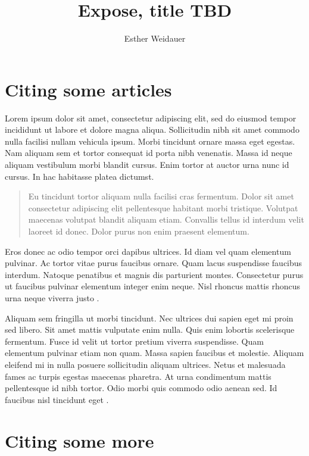 \documentclass[a4paper]{article}
\title{Expose, title TBD}
\author{Esther Weidauer}
\date{\DTMdate{2025-06-30}}
\begin{document}
\maketitle

\section{Citing some articles}

Lorem ipsum dolor sit amet, consectetur adipiscing elit, sed do eiusmod tempor incididunt ut labore et dolore magna aliqua. Sollicitudin nibh sit amet commodo nulla facilisi nullam vehicula ipsum. Morbi tincidunt ornare massa eget egestas. Nam aliquam sem et tortor consequat id porta nibh venenatis. Massa id neque aliquam vestibulum morbi blandit cursus. Enim tortor at auctor urna nunc id cursus. In hac habitasse platea dictumst.

\begin{quote}
	Eu tincidunt tortor aliquam nulla facilisi cras fermentum. Dolor sit amet consectetur adipiscing elit pellentesque habitant morbi tristique. Volutpat maecenas volutpat blandit aliquam etiam. Convallis tellus id interdum velit laoreet id donec. Dolor purus non enim praesent elementum.
\end{quote}

Eros donec ac odio tempor orci dapibus ultrices. Id diam vel quam elementum pulvinar. Ac tortor vitae purus faucibus ornare. Quam lacus suspendisse faucibus interdum. Natoque penatibus et magnis dis parturient montes. Consectetur purus ut faucibus pulvinar elementum integer enim neque. Nisl rhoncus mattis rhoncus urna neque viverra justo \autocite{chen_statistical_2017}.

\bigskip

Aliquam sem fringilla ut morbi tincidunt. Nec ultrices dui sapien eget mi proin sed libero. Sit amet mattis vulputate enim nulla. Quis enim lobortis scelerisque fermentum. Fusce id velit ut tortor pretium viverra suspendisse. Quam elementum pulvinar etiam non quam. Massa sapien faucibus et molestie. Aliquam eleifend mi in nulla posuere sollicitudin aliquam ultrices. Netus et malesuada fames ac turpis egestas maecenas pharetra. At urna condimentum mattis pellentesque id nibh tortor. Odio morbi quis commodo odio aenean sed. Id faucibus nisl tincidunt eget \autocite{anderson_sample-size_2017}.

\section{Citing some more}
\end{document}
